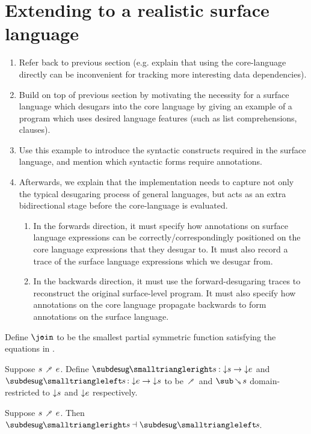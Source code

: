\newpage
\section{Extending to a realistic surface language}
\label{sec:surface-language}

\begin{enumerate}
   \item Refer back to previous section (e.g. explain that using the core-language directly can be inconvenient for tracking more interesting data dependencies).
   \item Build on top of previous section by motivating the necessity for a surface language which desugars into the core language by giving an example of a program which uses desired language features (such as list comprehensions, clauses).
   \item Use this example to introduce the syntactic constructs required in the surface language, and mention which syntactic forms require annotations.
   \item Afterwards, we explain that the implementation needs to capture not only the typical desugaring process of general languages, but acts as an extra bidirectional stage before the core-language is evaluated.
   \begin{enumerate}
      \item In the forwards direction, it must specify how annotations on surface language expressions can be correctly/correspondingly positioned on the core language expressions that they desugar to. It must also record a trace of the surface language expressions which we desugar from.
      \item In the backwards direction, it must use the forward-desugaring traces to reconstruct the original surface-level program. It must also specify how annotations on the core language propagate backwards to form annotations on the surface language.
   \end{enumerate}
\end{enumerate}



\begin{definition}
   Define $\disjjoin$ to be the smallest partial symmetric function satisfying the equations in .
\end{definition}

\begin{definition}
     Suppose $s \desugarFwdR e$. Define $\desugarFwdF{s}: \Below{s} \to \Below{e}$ and $\desugarBwdF{s}: \Below{e} \to \Below{s}$ to be $\desugarFwdR$ and $\desugarBwdR{s}$ domain-restricted to ${\downarrow}{s}$ and ${\downarrow}{e}$ respectively.
\end{definition}

\begin{theorem}
  \label{thm:surface-language:desugar:gc}
     Suppose $s \desugarFwdR e$. Then $\desugarFwdF{s} \adjoint \desugarBwdF{s}$.
\end{theorem}
